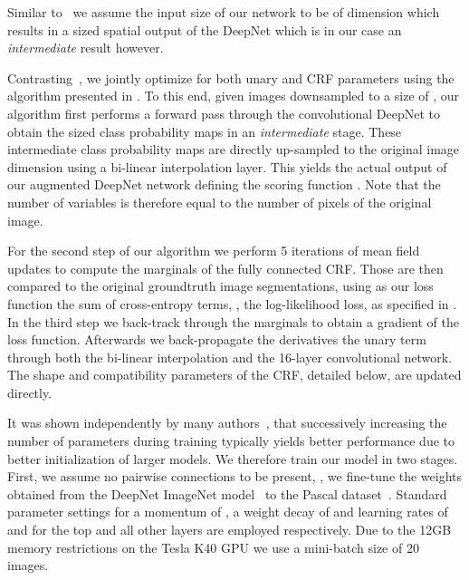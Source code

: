 Similar to~\cite{ChenARXIV2015b} we assume the input size of our network to be of dimension  which results in a  sized spatial output of the DeepNet which is in our case an \emph{intermediate} result however.

Contrasting~\cite{ChenARXIV2015b}, we jointly optimize for both unary and CRF parameters using the algorithm presented in . To this end, given images downsampled to a size of , our algorithm first performs a forward pass through the convolutional DeepNet to obtain the  sized class probability maps in an \emph{intermediate} stage. These intermediate class probability maps are directly  up-sampled to the original image dimension using a bi-linear interpolation layer. This yields the actual output of our augmented DeepNet network defining the scoring function . Note that the number  of variables  is therefore equal to the number of pixels of the original image.

For the second step of our algorithm we perform 5 iterations of mean field updates to compute the marginals  of the fully connected CRF. Those are then compared to the original groundtruth image segmentations, using as our loss function the sum of cross-entropy terms, \ie, the log-likelihood loss, as specified in . In the third step we back-track through the marginals to obtain a gradient of the loss function. Afterwards we back-propagate the derivatives \wrt the unary term through both the bi-linear interpolation and the 16-layer convolutional network. The shape and compatibility parameters of the CRF, detailed below, are updated directly.





It was shown independently by many authors~\cite{SimonyanARXIV2014,ChenARXIV2015}, that successively increasing the number of parameters during training typically yields better performance due to better initialization of larger models. We therefore train our model in two stages. First, we assume no pairwise connections to be present, \ie, we fine-tune the weights obtained from the DeepNet ImageNet model~\cite{SimonyanARXIV2014,ILSVRCarxiv14} to the Pascal dataset~\cite{pascal-voc-2012}. Standard parameter settings for a momentum of , a weight decay of  and learning rates of  and  for the top and all other layers  are employed respectively. Due to the 12GB memory restrictions on the Tesla K40 GPU we use a mini-batch size of 20 images.

